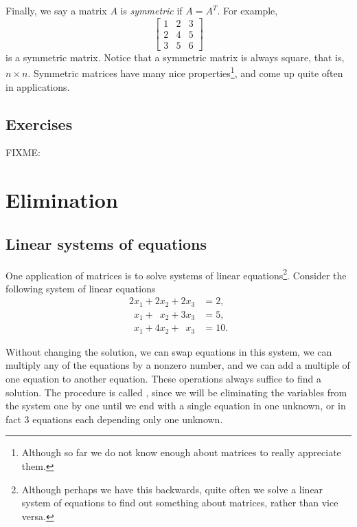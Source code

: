 Finally, we say a matrix $A$ is \emph{symmetric}
if $A = A^T$.  For example,
\begin{equation*}
\begin{bmatrix}
1 & 2 & 3 \\
2 & 4 & 5 \\
3 & 5 & 6
\end{bmatrix}
\end{equation*}
is a symmetric matrix.  Notice that a symmetric matrix is always
square, that is, $n \times n$.  Symmetric matrices 
have many nice properties\footnote{Although so far we do not know enough
about matrices to really appreciate them.},
and come up quite often in applications.

\subsection{Exercises}

FIXME:


\sectionnewpage
\section{Elimination}
\label{elim:section}


\subsection{Linear systems of equations}

One application of matrices is to solve systems of
linear equations\footnote{Although perhaps we have this backwards,
quite often we solve a linear system of equations
to find out something about matrices, rather than vice versa.}.
Consider the following system of linear equations
\begin{equation} \label{linalg:elim:eq}
\begin{aligned}
          2 x_1 +           2 x_2 +           2 x_3 & = 2 , \\
\phantom{9} x_1 + \phantom{9} x_2 +           3 x_3 & = 5 , \\
\phantom{9} x_1 +           4 x_2 + \phantom{9} x_3 & = 10 .
\end{aligned}
\end{equation}

Without changing the solution,
we can swap equations in this system,
we can multiply any of the equations by a nonzero number, and
we can add a multiple of one equation to another equation.
These operations always suffice to find a solution.
The procedure is called \emph{}, since
we will be eliminating the variables from the system
one by one until we end with a single equation in one unknown, or
in fact 3 equations each depending only one unknown.

